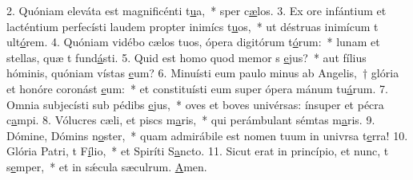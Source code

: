 2. Quóniam eleváta est magnificénti t\uline{u}a,~* sper c\uline{æ}los.
3. Ex ore infántium et lacténtium perfecísti laudem propter inimícs t\uline{u}os,~* ut déstruas inimícum t ult\uline{ó}rem.
4. Quóniam vidébo cælos tuos, ópera digitórum t\uline{ó}rum:~* lunam et stellas, quæ t fund\uline{á}sti.
5. Quid est homo quod memor s \uline{e}jus?~* aut fílius hóminis, quóniam vístas \uline{e}um?
6. Minuísti eum paulo minus ab Angelis,~† glória et honóre coronást \uline{e}um:~* et constituísti eum super ópera mánum tu\uline{á}rum.
7. Omnia subjecísti sub pédibs \uline{e}jus,~* oves et boves univérsas: ínsuper et pécra c\uline{a}mpi.
8. Vólucres cæli, et piscs m\uline{a}ris,~* qui perámbulant sémtas m\uline{a}ris.
9. Dómine, Dómins n\uline{o}ster,~* quam admirábile est nomen tuum in univrsa t\uline{e}rra!
10. Glória Patri, t F\uline{í}lio,~* et Spiríti S\uline{a}ncto.
11. Sicut erat in princípio, et nunc, t s\uline{e}mper,~* et in sǽcula sæculrum. \uline{A}men.
